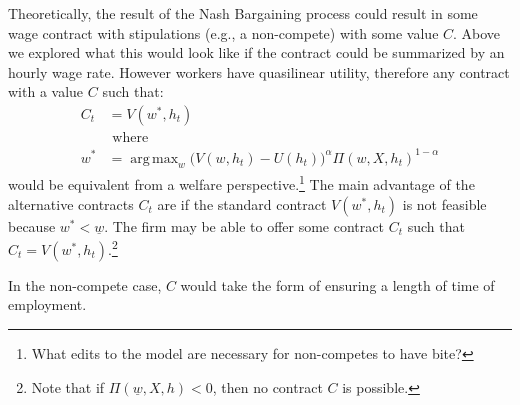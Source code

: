 \documentclass[11pt]{article}
\DeclareMathOperator*{\argmax}{arg\,max}
\begin{document}
Theoretically, the result of the Nash Bargaining process could result in
some wage contract with stipulations (e.g., a non-compete) with some value
$C$. Above we explored what this would look like if the contract could be
summarized by an hourly wage rate. However workers have quasilinear
utility, therefore any contract with a value $C$ such that:
 \begin{align*}
     C_t &= V(w^{*},h_t) \\
         &\text{ where }\\
    w^{*} &=  \argmax_w \big ( V(w,h_t) - U(h_t) \big )^{\alpha} \Pi(w,X,h_t)^{1-\alpha}
\end{align*}
would be equivalent from a welfare perspective.\footnote{What edits to the
model are necessary for non-competes to have bite?} The main advantage of
the alternative contracts $C_t$ are if the standard contract $V(w^{*},h_t)$
is not feasible because $w^{*} < \underline{w}$. The firm may be able to
offer some contract $C_t$ such that $C_t = V(w^{*},h_t)$.\footnote{Note
that if $\Pi(\underline{w},X,h) < 0$, then no contract $C$ is
possible.}

In the non-compete case, $C$ would take the form of ensuring a length of
time of employment.
\end{document}
